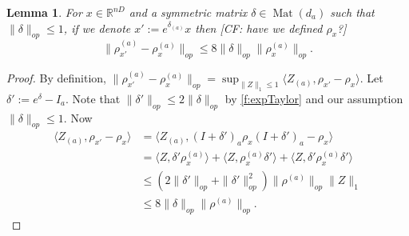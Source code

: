 \documentclass[aos]{imsart}
\newtheorem{lemma}[theorem]{Lemma}
\theoremstyle{definition}
\numberwithin{equation}{section}
\DeclareMathOperator{\Mat}{Mat}
\newcommand{\R}{{\mathbb{R}}}
\newcommand{\samp}{x}
\newcommand{\CF}[1]{{\color{purple}[CF: #1]}}
\begin{document}
\begin{appendix}

\begin{lemma} \label{atoaaRobustness}
For $\samp \in \R^{nD}$ and a symmetric matrix $\delta \in \Mat(d_{a})$ such that $\|\delta\|_{op} \leq 1$, if we denote $\samp' := e^{\delta_{(a)}} \samp$ then \CF{have we defined $\rho_x$?}
\[ \|\rho_{\samp'}^{(a)} - \rho_{\samp}^{(a)}\|_{op} \leq 8 \|\delta\|_{op} \|\rho_{\samp}^{(a)}\|_{op}   . \]
\end{lemma}
\begin{proof}By definition, $\|\rho_{\samp'}^{(a)} - \rho_{\samp}^{(a)}\|_{op} = \sup_{\|Z\|_{1} \leq 1} \langle Z_{(a)}, \rho_{\samp'} - \rho_{\samp} \rangle $.
Let $\delta' := e^{\delta} - I_{a}$. Note that $\|\delta'\|_{op} \leq 2 \|\delta\|_{op}$ by \cref{f:expTaylor} and our assumption $\|\delta\|_{op} \leq 1$. Now
\begin{align*} \langle Z_{(a)}, \rho_{\samp'} - \rho_{\samp} \rangle &= \langle Z_{(a)}, (I+\delta')_a \rho_{\samp} (I+\delta')_a - \rho_{\samp} \rangle \\
& = \langle Z, \delta' \rho_\samp^{(a)} \rangle + \langle Z, \rho_\samp^{(a)} \delta' \rangle + \langle Z, \delta' \rho_\samp^{(a)} \delta' \rangle \\
& \leq (2\|\delta'\|_{op} + \|\delta'\|_{op}^{2}) \|\rho^{(a)}\|_{op}\|Z\|_1  \\
&\leq 8 \|\delta\|_{op} \|\rho^{(a)}\|_{op}.\end{align*}
\end{proof}


\end{appendix}
\end{document}
